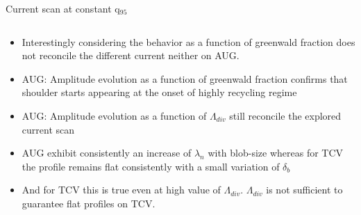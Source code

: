 \documentclass[10pt, compress]{beamer}
\begin{document}
\begin{frame}{Current scan at constant q$_{95}$}
\begin{columns}
\begin{column}{0.4\textwidth}
\begin{itemize}
{          detachment even if high density is
          achieved. Consistent with lower 
            volumetric recombination from DSS}
         \item<only@5> Interestingly considering the behavior as a
           function of greenwald fraction does not reconcile the
           different current neither on AUG.  
        \item<only@8> AUG: Amplitude evolution as a function of
          greenwald fraction confirms that shoulder starts appearing
          at the onset of highly recycling regime 
        \item<only@9> AUG: Amplitude evolution as a function of $\Lambda_{div}$ 
          still reconcile the explored current scan
        \item<only@10> AUG exhibit consistently an increase of
          $\lambda_n$ with blob-size whereas for TCV the profile
          remains flat consistently with a small variation of
          $\delta_b$
        \item<only@11> And for TCV this is true even at high value of
          $\Lambda_{div}$. \alert{$\Lambda_{div}$ is not sufficient to
          guarantee flat profiles on TCV.}
      \end{itemize}
    \end{column}
  \end{columns}
\end{frame}
\end{document}
